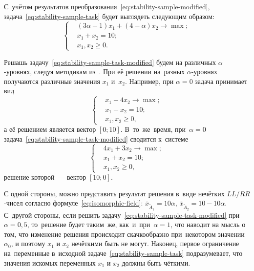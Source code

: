 С~учётом результатов преобразования~\eqref{eq:stability-sample-modified}, задача~\eqref{eq:stability-sample-task} будет выглядеть следующим образом:
\begin{equation}
\label{eq:stability-sample-task-modified}
  \left\{ \begin{aligned}
    & \left( 3\alpha+1\right)x_1+\left(4-\alpha \right)x_2 \to \max; \\
    & x_1 + x_2 = 10; \\
    & x_1, x_2 \geqslant 0.
  \end{aligned} \right.
\end{equation}

Решашь задачу~\eqref{eq:stability-sample-task-modified} будем на различных $\alpha$-уровнях, следуя методикам из~\cite{Matveev_Starodubtsev, Zak}. При её решении на~разных $\alpha$-уровнях получаются различные значения $x_1$ и~$x_2$. Например, при $\alpha=0$ задача принимает вид
\begin{equation*}
  \left\{ \begin{aligned}
    & x_1+4x_2 \to \max; \\
    & x_1 + x_2 = 10; \\
    & x_1, x_2 \geqslant 0,
  \end{aligned} \right.
\end{equation*}
а её решением является вектор $\left[0;10 \right]$. В~то~же~время, при~$\alpha=0$ задача~\eqref{eq:stability-sample-task-modified} сводится к~системе
\begin{equation*}
  \left\{ \begin{aligned}
    & 4x_1+3x_2 \to \max; \\
    & x_1 + x_2 = 10; \\
    & x_1, x_2 \geqslant 0,
  \end{aligned} \right.
\end{equation*}
решение которой~--- вектор $\left[10;0 \right]$.

С одной стороны, можно представить результат решения в~виде нечётких $LL/RR$-чисел согласно формуле~\eqref{eq:isomorphic-field}: $\bar{x}_{\tilde A_1}=10\alpha$, $\bar{x}_{\tilde A_2}=10-10\alpha$. С~другой стороны, если решить задачу~\eqref{eq:stability-sample-task-modified} при~$\alpha=0,5$, то~решение будет таким~же, как~и~при~$\alpha=1$, что наводит на мысль о том, что изменение решения происходит скачкообразно при~некотором значении $\alpha_0$, и поэтому $x_1$ и $x_2$ нечёткими быть не могут. Наконец, первое ограничение на~переменные в~исходной задаче~\eqref{eq:stability-sample-task} подразумевает, что значения искомых переменных $x_1$ и $x_2$ должны быть чёткими.

